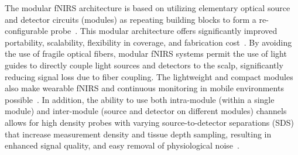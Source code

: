 The modular fNIRS architecture is based on utilizing elementary optical source and detector circuits (modules) as repeating building blocks to form a re-configurable probe~\cite{Zhao2017}. This modular architecture offers significantly improved portability, scalability, flexibility in coverage, and fabrication cost~\cite{Zhao2017}. By avoiding the use of fragile optical fibers, modular fNIRS systems permit the use of light guides to directly couple light sources and detectors to the scalp, significantly reducing signal loss due to fiber coupling. The lightweight and compact modules also make wearable fNIRS and continuous monitoring in mobile environments possible~\cite{Yucel2017, Park2018}. In addition, the ability to use both intra-module (within a single module) and inter-module (source and detector on different modules) channels allows for high density probes with varying source-to-detector separations (SDS) that increase measurement density and tissue depth sampling, resulting in enhanced signal quality, and easy removal of physiological noise~\cite{Gregg2010}. 


